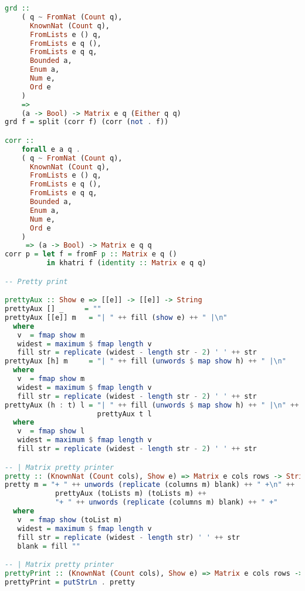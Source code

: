 \documentclass[
  oneside,
  11pt, a4paper,
  footinclude=true,
  headinclude=true,
  cleardoublepage=empty
]{scrbook}
\theoremstyle{definition}
\theoremstyle{definition}
\begin{document}
\begin{lstlisting}[language=Haskell, caption={Matrix.Internal},captionpos=b]
grd :: 
    ( q ~ FromNat (Count q),
      KnownNat (Count q),
      FromLists e () q,
      FromLists e q (),
      FromLists e q q,
      Bounded a,
      Enum a,
      Num e,
      Ord e
    )
    =>
    (a -> Bool) -> Matrix e q (Either q q)
grd f = split (corr f) (corr (not . f))

corr :: 
    forall e a q . 
    ( q ~ FromNat (Count q),
      KnownNat (Count q),
      FromLists e () q,
      FromLists e q (),
      FromLists e q q,
      Bounded a,
      Enum a,
      Num e,
      Ord e
    ) 
     => (a -> Bool) -> Matrix e q q
corr p = let f = fromF p :: Matrix e q ()
          in khatri f (identity :: Matrix e q q)

-- Pretty print

prettyAux :: Show e => [[e]] -> [[e]] -> String
prettyAux [] _     = ""
prettyAux [[e]] m   = "| " ++ fill (show e) ++ " |\n"
  where
   v  = fmap show m
   widest = maximum $ fmap length v
   fill str = replicate (widest - length str - 2) ' ' ++ str
prettyAux [h] m     = "| " ++ fill (unwords $ map show h) ++ " |\n"
  where
   v  = fmap show m
   widest = maximum $ fmap length v
   fill str = replicate (widest - length str - 2) ' ' ++ str
prettyAux (h : t) l = "| " ++ fill (unwords $ map show h) ++ " |\n" ++ 
                      prettyAux t l
  where
   v  = fmap show l
   widest = maximum $ fmap length v
   fill str = replicate (widest - length str - 2) ' ' ++ str

-- | Matrix pretty printer
pretty :: (KnownNat (Count cols), Show e) => Matrix e cols rows -> String
pretty m = "+ " ++ unwords (replicate (columns m) blank) ++ " +\n" ++ 
            prettyAux (toLists m) (toLists m) ++
            "+ " ++ unwords (replicate (columns m) blank) ++ " +"
  where
   v  = fmap show (toList m)
   widest = maximum $ fmap length v
   fill str = replicate (widest - length str) ' ' ++ str
   blank = fill ""

-- | Matrix pretty printer
prettyPrint :: (KnownNat (Count cols), Show e) => Matrix e cols rows -> IO ()
prettyPrint = putStrLn . pretty
    \end{lstlisting}

\end{document}
